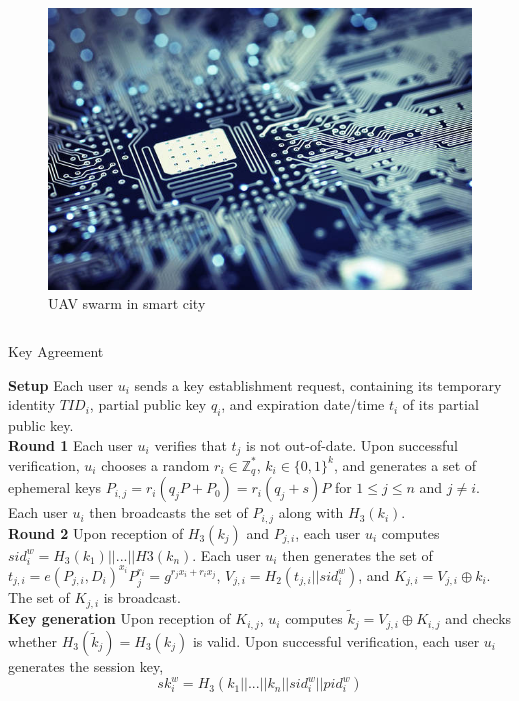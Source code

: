 \documentclass[final]{beamer}
\newlength{\onecolwid}
\newlength{\twocolwid}
\begin{document}
\begin{frame}[t]
\begin{columns}[t]
\begin{column}{\twocolwid}
\begin{figure}
\includegraphics[width=\linewidth]{images/stock.jpg}
\caption{UAV swarm in smart city}
\vspace{-1cm}
\end{figure}


\begin{columns}[t,totalwidth=\twocolwid] %

\begin{column}{\onecolwid}\vspace{-.6in} %

\begin{block}{Key Agreement}

\textbf{Setup} Each user $u_i$ sends a key establishment request, containing its temporary identity $TID_i$, partial public key $q_i$, and expiration date/time $t_i$ of its partial public key. \\
\textbf{Round 1} Each user $u_i$ verifies that $t_j$ is not out-of-date. Upon successful verification, $u_i$ chooses a random $r_i \in \mathbb{Z}_q^*$, $k_i \in \{0,1\}^k$, and generates a set of ephemeral keys $P_{i,j}=r_i(q_jP+P_0)=r_i(q_j+s)P$ for $1\leq j\leq n$ and $j\neq i$. Each user $u_i$ then broadcasts the set of $P_{i,j}$ along with $H_3(k_i)$. \\
\textbf{Round 2} Upon reception of $H_3(k_j)$ and $P_{j,i}$, each user $u_i$ computes $sid_i^w=H_3(k_1)||...||H3(k_n)$. Each user $u_i$ then generates the set of $t_{j,i}=e(P_{j,i},D_i)^{x_i}P_j^{r_i}=g^{r_jx_i+r_ix_j}$, $V_{j,i}=H_2(t_{j,i}||sid_i^w)$, and $K_{j,i}=V_{j,i}\oplus k_i$. The set of $K_{j,i}$ is broadcast. \\
\textbf{Key generation} Upon reception of $K_{i,j}$, $u_i$ computes $\tilde{k}_j=V_{j,i}\oplus K_{i,j}$ and checks whether $H_3(\tilde{k}_j)=H_3(k_j)$ is valid. Upon successful verification, each user $u_i$ generates the session key, \[sk_i^w=H_3(k_1||...||k_n||sid_i^w||pid_i^w)\]


\end{block}
\end{column}
\end{columns}
\end{column}
\end{columns}
\end{frame}
\end{document}
